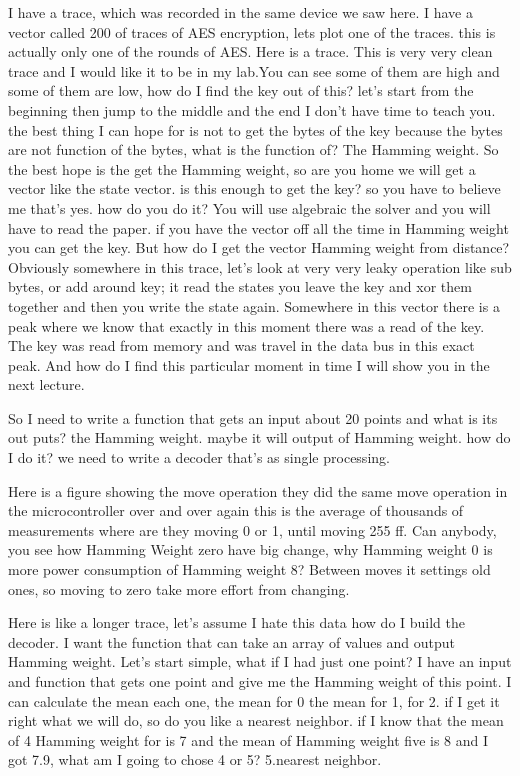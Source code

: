 I have a trace, which was recorded in the same device we saw here. I have a
vector called 200 of traces of AES encryption, lets plot one of the traces. this
is actually only one of the rounds of AES. Here is a trace. This is very very
clean trace and I would like it to be in my lab.You can see some of them are
high and some of them are low, how do I find the key out of this? let's start
from the beginning then jump to the middle and the end I don't have time to
teach you. the best thing I can hope for is not to get the bytes of the key
because the bytes are not function of the bytes, what is the function of? The
Hamming weight. So the best hope is the get the Hamming weight, so are you home
we will get a vector like the state vector. is this enough to get the key? so
you have to believe me that's yes. how do you do it? You will use algebraic the
solver and you will have to read the paper. if you have the vector off all the
time in Hamming weight you can get the key. But how do I get the vector Hamming
weight from distance? Obviously somewhere in this trace, let's look at very very
leaky operation like sub bytes, or add around key; it read the states you leave
the key and xor them together and then you write the state again. Somewhere in
this vector there is a peak where we know that exactly in this moment there was
a read of the key. The key was read from memory and was travel in the data bus
in this exact peak. And how do I find this particular moment in time I will show
you in the next lecture.

So I need to write a function that gets an input about 20 points and what is its
out puts? the Hamming weight. maybe it will output of Hamming weight. how do I
do it? we need to write a decoder that's as single processing.

Here is a figure showing the move operation they did the same move operation in
the microcontroller over and over again this is the average of thousands of
measurements where are they moving 0 or 1, until moving 255 ff. Can anybody, you
see how Hamming Weight zero have big change, why Hamming weight 0 is more power
consumption of Hamming weight 8? Between moves it settings old ones, so moving
to zero take more effort from changing.
 
Here is like a longer trace, let's assume I hate this data how do I build the
decoder. I want the function that can take an array of values and output Hamming
weight. Let's start simple, what if I had just one point? I have an input and
function that gets one point and give me the Hamming weight of this point. I can
calculate the mean each one, the mean for 0 the mean for 1, for 2. if I get it
right what we will do, so do you like a nearest neighbor. if I know that the
mean of 4 Hamming weight for is 7 and the mean of Hamming weight five is 8 and I
got 7.9, what am I going to chose 4 or 5? 5.nearest neighbor.

